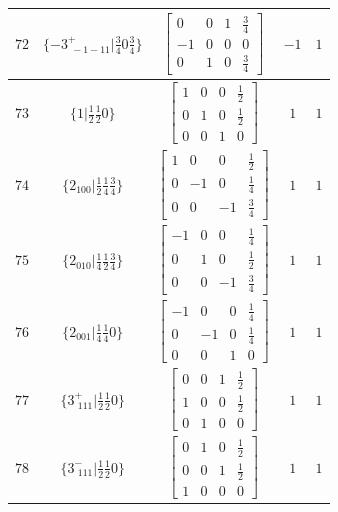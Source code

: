 \documentclass[fleqn,8pt]{jsarticle}
\begin{document}
\begin{longtable}{ccccc}
$ 72 $ & $ \{-3^{+}_{\,\,-1-11}|\frac{3}{4} 0 \frac{3}{4}\} $ & $ \begin{bmatrix} 0 & 0 & 1 & \frac{3}{4} \\ -1 & 0 & 0 & 0 \\ 0 & 1 & 0 & \frac{3}{4} \end{bmatrix} $ & $ -1 $ & $ 1 $ \\ \hline
$ 73 $ & $ \{1|\frac{1}{2} \frac{1}{2} 0\} $ & $ \begin{bmatrix} 1 & 0 & 0 & \frac{1}{2} \\ 0 & 1 & 0 & \frac{1}{2} \\ 0 & 0 & 1 & 0 \end{bmatrix} $ & $ 1 $ & $ 1 $ \\ \hline
$ 74 $ & $ \{2{}_{100}|\frac{1}{2} \frac{1}{4} \frac{3}{4}\} $ & $ \begin{bmatrix} 1 & 0 & 0 & \frac{1}{2} \\ 0 & -1 & 0 & \frac{1}{4} \\ 0 & 0 & -1 & \frac{3}{4} \end{bmatrix} $ & $ 1 $ & $ 1 $ \\ \hline
$ 75 $ & $ \{2{}_{010}|\frac{1}{4} \frac{1}{2} \frac{3}{4}\} $ & $ \begin{bmatrix} -1 & 0 & 0 & \frac{1}{4} \\ 0 & 1 & 0 & \frac{1}{2} \\ 0 & 0 & -1 & \frac{3}{4} \end{bmatrix} $ & $ 1 $ & $ 1 $ \\ \hline
$ 76 $ & $ \{2{}_{001}|\frac{1}{4} \frac{1}{4} 0\} $ & $ \begin{bmatrix} -1 & 0 & 0 & \frac{1}{4} \\ 0 & -1 & 0 & \frac{1}{4} \\ 0 & 0 & 1 & 0 \end{bmatrix} $ & $ 1 $ & $ 1 $ \\ \hline
$ 77 $ & $ \{3^{+}_{\,\,111}|\frac{1}{2} \frac{1}{2} 0\} $ & $ \begin{bmatrix} 0 & 0 & 1 & \frac{1}{2} \\ 1 & 0 & 0 & \frac{1}{2} \\ 0 & 1 & 0 & 0 \end{bmatrix} $ & $ 1 $ & $ 1 $ \\ \hline
$ 78 $ & $ \{3^{-}_{\,\,111}|\frac{1}{2} \frac{1}{2} 0\} $ & $ \begin{bmatrix} 0 & 1 & 0 & \frac{1}{2} \\ 0 & 0 & 1 & \frac{1}{2} \\ 1 & 0 & 0 & 0 \end{bmatrix} $ & $ 1 $ & $ 1 $ \\ \hline

\end{longtable}
\end{document}
